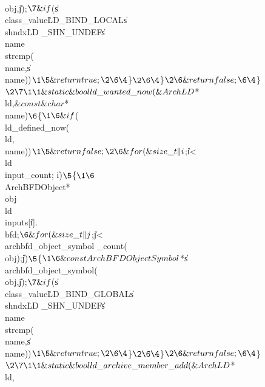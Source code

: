 \\{obj},\|j);{}$\7
\&{if} ${}(\|s\MG\\{class\_value}\I\.{LD\_BIND\_LOCAL}\W\|s\MG\\{shndx}\I\.{LD%
\_SHN\_UNDEF}\W\|s\MG\\{name}\W\R\\{strcmp}(\\{name},\|s\MG\\{name})){}$\1\5
\&{return} \\{true};\2\6
\4${}\}{}$\2\6
\4${}\}{}$\2\6
\&{return} \\{false};\6
\4${}\}{}$\2\7
\1\1\&{static} \&{bool} \\{ld\_wanted\_now}(\&{ArchLD} ${}{*}\\{ld},$%
\&{const} \&{char} ${}{*}\\{name})\2\2{}$\6
${}\{{}$\1\6
\&{if} ${}(\\{ld\_defined\_now}(\\{ld},\\{name})){}$\1\5
\&{return} \\{false};\2\6
\&{for} (\&{size\_t} \|i${}\K{};{}$ ${}\|i<\\{ld}\MG\\{input\_count};{}$ ${}%
\|i\PP){}$\5
${}\{{}$\1\6
${}\\{ArchBFDObject}*\\{obj}\K\\{ld}\MG\\{inputs}[\|i].\\{bfd};{}$\6
\&{for} (\&{size\_t} \|j${}\K{};{}$ ${}\|j<\\{archbfd\_object\_symbol%
\_count}(\\{obj});{}$ ${}\|j\PP){}$\5
${}\{{}$\1\6
\&{const} \\{ArchBFDObjectSymbol}${}{*}\|s\K\\{archbfd\_object\_symbol}(%
\\{obj},\|j);{}$\7
\&{if} ${}(\|s\MG\\{class\_value}\E\.{LD\_BIND\_GLOBAL}\W\|s\MG\\{shndx}\E\.{LD%
\_SHN\_UNDEF}\W\|s\MG\\{name}\W\R\\{strcmp}(\\{name},\|s\MG\\{name})){}$\1\5
\&{return} \\{true};\2\6
\4${}\}{}$\2\6
\4${}\}{}$\2\6
\&{return} \\{false};\6
\4${}\}{}$\2\7
\1\1\&{static} \&{bool} \\{ld\_archive\_member\_add}(\&{ArchLD} ${}{*}\\{ld},%
